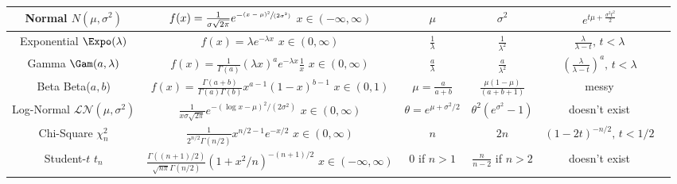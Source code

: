 \documentclass[10pt,landscape]{article}
\begin{document}
\begin{center}
\begin{tabular}{cccccc}
\hline
\shortstack{Normal \\ $N(\mu, \sigma^2)$} & \shortstack{$f(x) = \frac{1}{\sigma \sqrt{2\pi}} e^{-\sfrac{(x - \mu)^2}{(2 \sigma^2)}}$ \\ $x \in (-\infty, \infty)$} & $\mu$  & $\sigma^2$ & $e^{t\mu + \frac{\sigma^2t^2}{2}}$\\
\hline
\shortstack{Exponential \\ $\Expo(\lambda)$} & \shortstack{$f(x) = \lambda e^{-\lambda x}$\\$ x \in (0, \infty)$} & $\frac{1}{\lambda}$  & $\frac{1}{\lambda^2}$ & $\frac{\lambda}{\lambda - t}, \, t < \lambda$\\
\hline
\shortstack{Gamma \\ $\Gam(a, \lambda)$} & \shortstack{$f(x) = \frac{1}{\Gamma(a)}(\lambda x)^ae^{-\lambda x}\frac{1}{x}$\\$ x \in (0, \infty)$} & $\frac{a}{\lambda}$  & $\frac{a}{\lambda^2}$ & $\left(\frac{\lambda}{\lambda - t}\right)^a, \, t < \lambda$\\
\hline
\shortstack{Beta \\ Beta($a, b$)} & \shortstack{$f(x) = \frac{\Gamma(a+b)}{\Gamma(a)\Gamma(b)}x^{a-1}(1-x)^{b-1}$\\$x \in (0, 1) $} & $\mu = \frac{a}{a + b}$  & $\frac{\mu(1-\mu)}{(a + b + 1)}$ & messy \\
\hline
\shortstack{Log-Normal \\ $\mathcal{LN}(\mu,\sigma^2)$} & \shortstack{$\frac{1}{x\sigma \sqrt{2\pi}}e^{-(\log x - \mu)^2/(2\sigma^2)}$\\$x \in (0, \infty)$} & $\theta = e^{ \mu + \sigma^2/2}$ & $\theta^2 (e^{\sigma^2} - 1)$ & doesn't exist\\
\hline
\shortstack{Chi-Square \\ $\chi_n^2$} & \shortstack{$\frac{1}{2^{n/2}\Gamma(n/2)}x^{n/2 - 1}e^{-x/2}$\\$x \in (0, \infty) $} & $n$  & $2n$ & $(1 - 2t)^{-n/2}, \, t < 1/2$\\
\hline
\shortstack{Student-$t$ \\ $t_n$} & \shortstack{$\frac{\Gamma((n+1)/2)}{\sqrt{n\pi} \Gamma(n/2)} (1+x^2/n)^{-(n+1)/2}$\\$x \in (-\infty, \infty)$} & $0$ if $n>1$ & $\frac{n}{n-2}$ if $n>2$ & doesn't exist\\
\hline
\end{tabular}
\end{center}

\newpage
\end{document}
